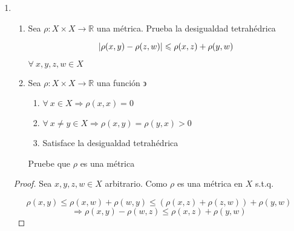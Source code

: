 \documentclass[12pt]{article}
\newcommand{\subscript}[2]{$#1 _ #2$}
\newcommand\R{\ensuremath{\mathbb{R}}}
\begin{document}
\begin{enumerate}[label=\textbf{\arabic*}.]
\begin{proof}
\begin{enumerate}[label=(\subscript{D}{{\arabic*}})]
\begin{enumerate}[label=\alph*)]
\begin{equation*}
    {\rho}_{3}(x,y)+{\rho}_{3}(y,z)= \rho(x,y))+{\rho}(y,z) \geqslant {\rho}(x,z) \geqslant {\rho}_{3}(x,z) \Rightarrow
\end{equation*}
\begin{equation*}
    {\rho}_{3}(x,z) \leqslant {\rho}_{3}(x,y) +{\rho}_{3}(y,z)
\end{equation*}

\end{enumerate}
\end{enumerate}

$\therefore {\rho}_{3}(x,y)$ es una métrica en $\mathbb{R}^{n}$
    
\end{proof}

\item \begin{enumerate}[label=\alph*)]
    \item Sea $\rho : X \times X \to \R$ una métrica. Prueba la desigualdad tetrahédrica

    \begin{equation*}
        \abs{\rho(x,y)-\rho(z,w)} \leqslant \rho(x,z) +\rho(y,w)
    \end{equation*}

    $\forall \: x,y,z,w \in X$
    \item Sea $\rho : X \times X \to \R$ una función $\backepsilon$
    \begin{enumerate}
        \item $\forall \: x \in X \Rightarrow \rho(x,x) = 0  $
        \item $\forall \: x \neq y \in X \Rightarrow \rho(x,y) = \rho(y,x) > 0  $
        \item Satisface la desigualdad tetrahédrica
    \end{enumerate}

    Pruebe que $\rho$ es una métrica
    \end{enumerate}

\begin{proof}
    Sea $x,y,z,w \in X$ arbitrario. Como $\rho$ es una métrica en $X$ s.t.q.

    \begin{equation*}
        \rho(x,y) \leqslant \rho(x,w) + \rho(w,y) \leqslant (\rho(x,z) + \rho(z,w)) + \rho(y,w) 
    \end{equation*}
    \begin{equation*}
        \Rightarrow \rho(x,y) - \rho(w,z) \leqslant  \rho(x,z)  + \rho(y,w)
    \end{equation*}


\end{proof}
\end{enumerate}
\end{document}
